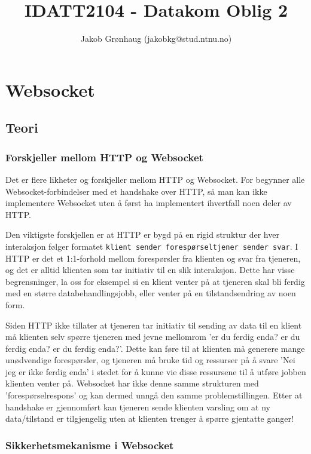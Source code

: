 \documentclass{article}
\title{IDATT2104 - Datakom Oblig 2}
\author{Jakob Grønhaug (jakobkg@stud.ntnu.no)}
\newcommand{\code}[1]{\colorbox{light-gray}{\texttt{#1}}}
\begin{document}
\maketitle

\tableofcontents

\section{Websocket}
\subsection{Teori}

\subsubsection{Forskjeller mellom HTTP og Websocket}

Det er flere likheter og forskjeller mellom HTTP og Websocket. For begynner alle Websocket-forbindelser med et handshake over HTTP, så man kan ikke implementere Websocket uten å først ha implementert ihvertfall noen deler av HTTP.

Den viktigste forskjellen er at HTTP er bygd på en rigid struktur der hver interaksjon følger formatet \code{klient sender forespørsel\rightarrow tjener sender svar}. I HTTP er det et 1:1-forhold mellom forespørsler fra klienten og svar fra tjeneren, og det er alltid klienten som tar initiativ til en slik interaksjon. Dette har visse begrensninger, la oss for eksempel si en klient venter på at tjeneren skal bli ferdig med en større databehandlingsjobb, eller venter på en tilstandsendring av noen form. 

Siden HTTP ikke tillater at tjeneren tar initiativ til sending av data til en klient må klienten selv spørre tjeneren med jevne mellomrom 'er du ferdig enda? er du ferdig enda? er du ferdig enda?'. Dette kan føre til at klienten må generere mange unødvendige forespørsler, og tjeneren må bruke tid og ressurser på å svare 'Nei jeg er ikke ferdig enda' i stedet for å kunne vie disse ressursene til å utføre jobben klienten venter på. Websocket har ikke denne samme strukturen med 'forespørsel\rightarrow respons' og kan dermed unngå den samme problemstillingen. Etter at handshake er gjennomført kan tjeneren sende klienten varsling om at ny data/tilstand er tilgjengelig uten at klienten trenger å spørre gjentatte ganger!

\subsubsection{Sikkerhetsmekanisme i Websocket}
\end{document}
